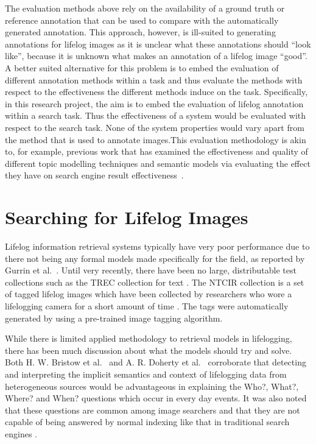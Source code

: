 \documentclass[12pt,a4paper]{article}
\begin{document}
The evaluation methods above rely on the availability of a ground truth or reference annotation that can be used to compare with the automatically generated annotation. This approach, however, is ill-suited to generating annotations for lifelog images as it is unclear what these annotations should ``look like'', because it is unknown what makes an annotation of a lifelog image ``good''. A better suited alternative for this problem is to embed the evaluation of different annotation methods within a task and thus evaluate the  methods with respect to the effectiveness the different methods induce on the task. Specifically, in this research project, the aim is to embed the evaluation of lifelog annotation within a search task. Thus the effectiveness of a system would be evaluated with respect to the search task. None of the system properties would vary apart from the method that is used to annotate images.This evaluation methodology is akin to, for example, previous work that has examined the effectiveness and quality of different topic modelling techniques and semantic models via evaluating the effect they have on search engine result effectiveness~\cite{wei2006lda,zuccon2015integrating,karimzadehgan2010estimation,yi2009comparative}.

\section{Searching for Lifelog Images}

Lifelog information retrieval systems typically have very poor performance due to there not being any formal models made specifically for the field, as reported by Gurrin et al.~\citep{gurrin2014lifelogging}. Until very recently, there have been no large, distributable test collections such as the TREC collection for text \citep{gurrin2014lifelogging}. The NTCIR collection is a set of tagged lifelog images which have been collected by researchers who wore a lifelogging camera for a short amount of time \citep{gurrin2016ntcir}. The tags were automatically generated by using a pre-trained image tagging algorithm.

While there is limited applied methodology to retrieval models in lifelogging, there has been much discussion about what the models should try and solve. Both H.  W.  Bristow et al.~\citep{bristow2004defining} and A. R. Doherty et al.~\cite{doherty2010automatically} corroborate that detecting and interpreting the implicit semantics and context of lifelogging data from heterogeneous sources would be advantageous in explaining the Who?, What?, Where? and When? questions which occur in every day events. It was also noted that these questions are common among image searchers and that they are not capable of being answered by normal indexing like that in traditional search engines \citep{ali2010semantically}.
\end{document}
